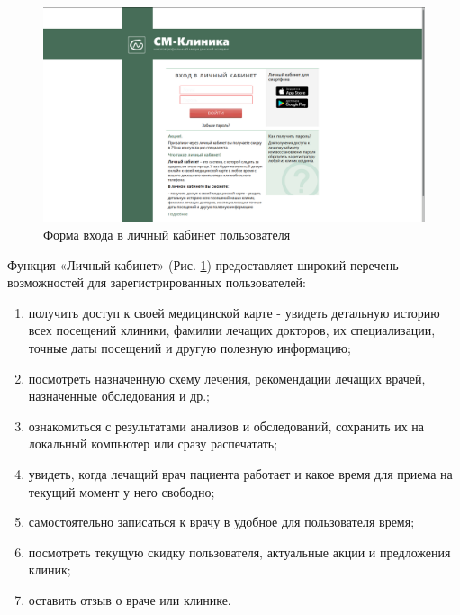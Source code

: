 \documentclass[14pt,a4paper,russian]{extreport}
\begin{document}
\begin{figure}[b!]
        \includegraphics[width=\textwidth]{lkcm}
        \caption{Форма входа в личный кабинет пользователя}
        \label{fig:lkcm}
\end{figure}

\cleardoublepage
Функция «Личный кабинет» (Рис. \ref{fig:lkcm}) предоставляет широкий перечень возможностей для зарегистрированных
пользователей:\cite{smclin}

\begin{enumerate}[noitemsep]
    \item получить доступ к своей медицинской карте - увидеть детальную историю всех посещений
        клиники, фамилии лечащих докторов, их специализации, точные даты посещений и другую
        полезную информацию;

    \item посмотреть назначенную схему лечения, рекомендации лечащих врачей, назначенные
        обследования и др.;

    \item ознакомиться с результатами анализов и обследований, сохранить их на локальный компьютер или
        сразу распечатать;

    \item увидеть, когда лечащий врач пациента работает и какое время для приема на текущий момент у него
        свободно;

    \item самостоятельно записаться к врачу в удобное для пользователя время;

    \item посмотреть текущую скидку пользователя, актуальные акции и предложения клиник;

    \item оставить отзыв о враче или клинике.
\end{enumerate}
\end{document}
